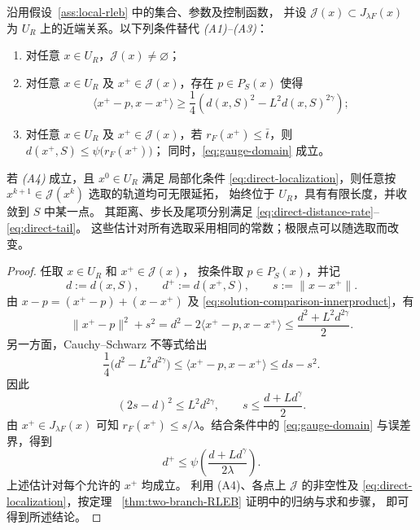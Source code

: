 \begin{corollary}[集值近端关系的推广]
\label{cor:selection-extension}
沿用假设~\ref{ass:local-rleb} 中的集合、参数及控制函数，
并设 $\mathcal J(x)\subset J_{\lambda F}(x)$
为 $U_R$ 上的近端关系。以下列条件替代
\emph{(A1)--(A3)}：
\begin{enumerate}
\item 对任意 $x\in U_R$，$\mathcal J(x)\ne\varnothing$；

\item 对任意 $x\in U_R$ 及
$x^+\in\mathcal J(x)$，存在 $p\in P_S(x)$
使得
\begin{equation}
\label{eq:solution-comparison-innerproduct}
 \langle x^+-p,x-x^+\rangle
 \geq\frac14\left(
   d(x,S)^2-L^2d(x,S)^{2\gamma}
 \right);
\end{equation}

\item 对任意 $x\in U_R$ 及
$x^+\in\mathcal J(x)$，若
$r_F(x^+)\leq\bar t$，则
$d(x^+,S)\leq\psi\bigl(r_F(x^+)\bigr)$；
同时，\eqref{eq:gauge-domain} 成立。
\end{enumerate}

若 \emph{(A4)} 成立，且 $x^0\in U_R$ 满足
局部化条件 \eqref{eq:direct-localization}，则任意按
$x^{k+1}\in\mathcal J(x^k)$ 选取的轨道均可无限延拓，
始终位于 $U_R$，具有有限长度，并收敛到 $S$ 中某一点。
其距离、步长及尾项分别满足
\eqref{eq:direct-distance-rate}--\eqref{eq:direct-tail}。
这些估计对所有选取采用相同的常数；极限点可以随选取而改变。
\end{corollary}

\begin{proof}
任取 $x\in U_R$ 和 $x^+\in\mathcal J(x)$，
按条件取 $p\in P_S(x)$，并记
\[
 d:=d(x,S),\qquad
 d^+:=d(x^+,S),\qquad
 s:=\|x-x^+\|.
\]
由 $x-p=(x^+-p)+(x-x^+)$ 及
\eqref{eq:solution-comparison-innerproduct}，有
\[
 \|x^+-p\|^2+s^2
 =d^2-2\langle x^+-p,x-x^+\rangle
 \leq\frac{d^2+L^2d^{2\gamma}}2.
\]
另一方面，Cauchy--Schwarz 不等式给出
\[
 \frac14\bigl(d^2-L^2d^{2\gamma}\bigr)
 \leq\langle x^+-p,x-x^+\rangle
 \leq ds-s^2.
\]
因此
\[
 (2s-d)^2\leq L^2d^{2\gamma},
 \qquad
 s\leq\frac{d+Ld^\gamma}{2}.
\]
由 $x^+\in J_{\lambda F}(x)$ 可知
$r_F(x^+)\leq s/\lambda$。结合条件中的
\eqref{eq:gauge-domain} 与误差界，得到
\[
 d^+\leq
 \psi\!\left(\frac{d+Ld^\gamma}{2\lambda}\right).
\]
上述估计对每个允许的 $x^+$ 均成立。
利用 (A4)、各点上 $\mathcal J$ 的非空性及
\eqref{eq:direct-localization}，按定理~
\ref{thm:two-branch-RLEB} 证明中的归纳与求和步骤，
即可得到所述结论。
\end{proof}

